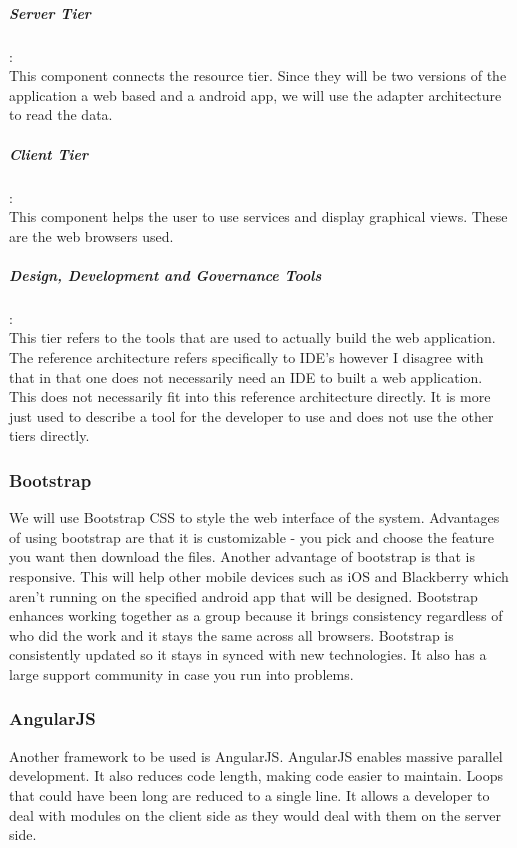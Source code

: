\documentclass[a4paper,12pt]{article}
\begin{document}
\subparagraph{Server Tier}\hspace{-10pt}:\\
This component connects the resource tier. Since they will be two versions of the application a web based and a android app, we will use the adapter architecture to read the data.
\subparagraph{Client Tier}\hspace{-10pt}:\\
This component helps the user to use services and display graphical views. These are the web browsers used.

\subparagraph{Design, Development and Governance Tools}\hspace{-10pt}:\\
This tier refers to the tools that are used to actually build the web application. The reference architecture refers specifically to IDE's however I disagree with that in that one does not necessarily need an IDE to built a web application. This does not necessarily fit into this reference architecture directly. It is more just used to describe a tool for the developer to use and does not use the other tiers directly.

\subsubsection{Bootstrap}We will use Bootstrap CSS to style the web interface of the system. Advantages of using bootstrap are that it is customizable - you pick and choose the feature you want then download the files. Another advantage of bootstrap is that is responsive. This will help other mobile devices such as iOS and Blackberry which aren’t running on the specified android app that will be designed. Bootstrap enhances working together as a group because it brings consistency regardless of who did the work and it stays the same across all browsers. Bootstrap is consistently updated so it stays in synced with new technologies. It also has a large support community in case you run into problems.\par 
\subsubsection{AngularJS}Another framework to be used is AngularJS. AngularJS enables massive parallel development. It also reduces code length, making code easier to maintain. Loops that could have been long are reduced to a single line. It allows a developer to deal with modules on the client side as they would deal with them on the server side.\par 
\end{document}

